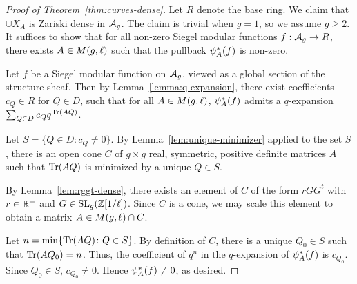 \documentclass{amsart}
\begin{document}
\begin{proof}[Proof of Theorem~\ref{thm:curves-dense}]
  Let $R$ denote the base ring. We claim that $\cup X_A$ is Zariski dense in $\mathcal{A}_g$. The claim is trivial when $g = 1$, so we assume $g \geq 2$. It suffices to show that for all non-zero Siegel modular functions $f: \mathcal{A}_g \to R$, there exists $A \in M(g,\ell)$ such that the pullback $\psi_{A}^*(f)$ is non-zero.

  Let $f$ be a Siegel modular function on $\mathcal{A}_g$, viewed as a global section of the structure sheaf. Then by Lemma~\ref{lemma:q-expansion}, there exist coefficients $c_Q \in R$ for $Q \in D$, such that for all $A \in M(g,\ell)$, $\psi_{A}^*(f)$ admits a $q$-expansion $\sum_{Q \in D} c_Q q^{\operatorname{Tr}(AQ)}$.

  Let $S = \{ Q \in D :c_Q \neq 0\}$. By Lemma~\ref{lem:unique-minimizer} applied to the set $S$, there is an open cone $C$ of $g \times g$ real, symmetric, positive definite matrices $A$ such that $\operatorname{Tr}(AQ)$ is minimized by a unique $Q \in S$.

  By Lemma~\ref{lem:rggt-dense}, there exists an element of $C$ of the form $rGG^t$ with $r \in \mathbb{R}^+$ and $G \in \operatorname{SL}_g(\mathbb{Z}[1/\ell])$. Since $C$ is a cone, we may scale this element to obtain a matrix $A \in M(g,\ell) \cap C$.

  Let $n = \min \{\operatorname{Tr}(AQ) \colon Q \in S\}$. By definition of $C$, there is a unique $Q_0 \in S$ such that $\operatorname{Tr}(AQ_0) = n$. %
  Thus, the coefficient of $q^n$ in the $q$-expansion of $\psi_{A}^*(f)$ is $c_{Q_0}$. Since $Q_0 \in S$, $c_{Q_0} \ne 0$. Hence $\psi_{A}^*(f) \neq 0$, as desired.
\end{proof}









\end{document}
